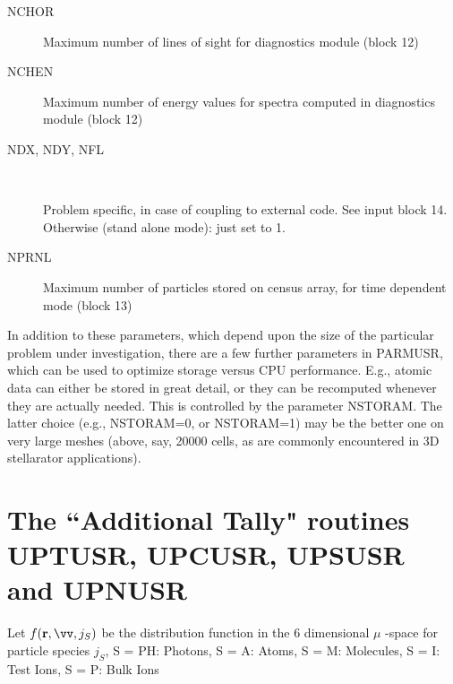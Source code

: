 \begin{description}
  \item[NCHOR] Maximum number of lines of sight for diagnostics module (block 12)
  \item[NCHEN] Maximum number of energy values for spectra computed in
        diagnostics module (block 12)
  \item[NDX, NDY, NFL]~ 

        Problem specific, in case of coupling to external code.
        See input block 14.
        Otherwise (stand alone mode): just set to 1.
  \item[NPRNL] Maximum number of particles stored on census array, for time
        dependent mode (block 13)
\end{description}

In addition to these parameters, which depend upon the size of the particular
problem under investigation, there are a few further parameters in PARMUSR,
which can be used to optimize storage versus CPU performance.
E.g., atomic data can either be stored in great detail, or they can be
recomputed whenever they are actually needed.
This is controlled by the parameter NSTORAM.
The latter choice (e.g., NSTORAM=0, or NSTORAM=1) may be the better one on very
large meshes (above, say, 20000 cells, as are commonly encountered in 3D
stellarator applications).

\newpage

\section{The ``Additional Tally" routines UPTUSR, UPCUSR, UPSUSR and UPNUSR}
\label{sec3.2}

Let $	f(\vr, \vv,j_S)$ be the distribution function in the 6 dimensional
$\mu$ -space for particle species $j_S$, S = PH:
Photons, S = A: Atoms, S = M: Molecules, S = I: Test Ions, S = P:
Bulk Ions 

